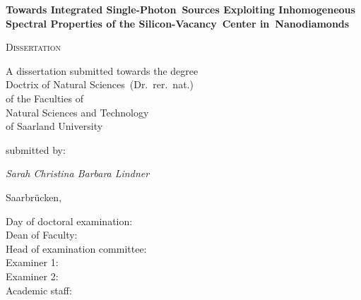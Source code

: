




\begin{titlepage}
	\centering
	\null\vfill

	{\huge\bfseries Towards Integrated Single-Photon~Sources Exploiting Inhomogeneous Spectral Properties of the Silicon-Vacancy~Center in~Nanodiamonds\par}



	\vfill

	{\scshape\Large Dissertation}
	\vfill


	{\large A dissertation submitted towards the degree\\
	Doctrix of Natural Sciences~(Dr.~rer.~nat.)\\
	of the Faculties of\\
  Natural Sciences and Technology\\
	of Saarland University}


	\vfill
	submitted by:
	\vfill

	{\Large\itshape Sarah Christina Barbara Lindner}

	\vfill

	{\large Saarbr\"ucken, \thesisdate{}}
	\vfill
\end{titlepage}



\newpage
\thispagestyle{plain}
\null
\vfill
\begin{description}
	\item[Day of doctoral examination:] %
 	\item[Dean of Faculty:] %
 	\item[Head of examination committee:] %
	\item[Examiner 1:] %
	\item[Examiner 2:] %
	\item[Academic staff:]%
\end{description}

\newpage




